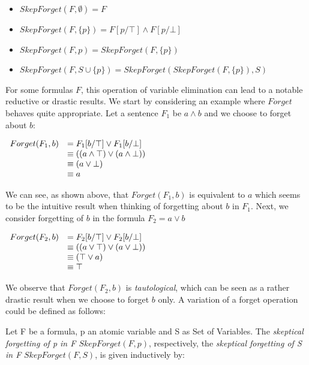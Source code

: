  \begin{itemize}
 \item $\mathit{SkepForget(F,\emptyset)} = F$
 \item $\mathit{SkepForget(F,\{p\})} = F[p/\top] \land F[p/\bot]$
 \item $\mathit{SkepForget}(F,p) = \mathit{SkepForget}(F,\{p\})$
 \item $\mathit{SkepForget(F,S \cup \{p\})} = \mathit{SkepForget(SkepForget(F,\{p\}), S)}$
 \end{itemize}
For some formulas $F$, this operation of variable elimination can lead to a notable reductive or drastic results. 
    We start by considering an example where $\mathit{Forget}$ behaves quite appropriate. 
    Let a sentence $F_1$ be $a \land b$ and we choose to forget about $b$:
\begin{center}$\begin{array}{l l}
Forget(F_1,b)&=F_1[b/\top] \lor F_1[b/\bot]\\ &\equiv ((a \land \top) \lor (a \land \bot)) \\
 &\equiv (a \lor \bot) \\
 &\equiv a \\
\end{array}$\end{center}
We can see, as shown above, that $\mathit{Forget(F_1,b)}$ is equivalent to $a$ which seems to be the intuitive result when thinking of forgetting about $b$ in $F_1$. 
        Next, we consider forgetting of $b$ in the formula $F_2 = a \lor b$
\begin{center}$\begin{array}{l l}
Forget(F_2,b)&=F_2[b/\top] \lor F_2[b/\bot]\\ &\equiv ((a \lor \top) \lor (a \lor \bot)) \\
 &\equiv (\top \lor a) \\
 &\equiv \top \\
\end{array}$\end{center}
We observe that $\mathit{Forget(F_2,b)}$ is \emph{tautological}, which can be seen as a rather drastic result when we choose to forget $b$ only.
    A variation of a forget operation could be defined as follows:
\begin{definition}
Let F be a formula, p an atomic variable and S as Set of Variables. The \emph{skeptical forgetting of p in F $\mathit{SkepForget}(F,p)$}, respectively, the \emph{skeptical forgetting of S in F} $\mathit{SkepForget(F,S)}$, is given inductively by:
\end{definition}
 
